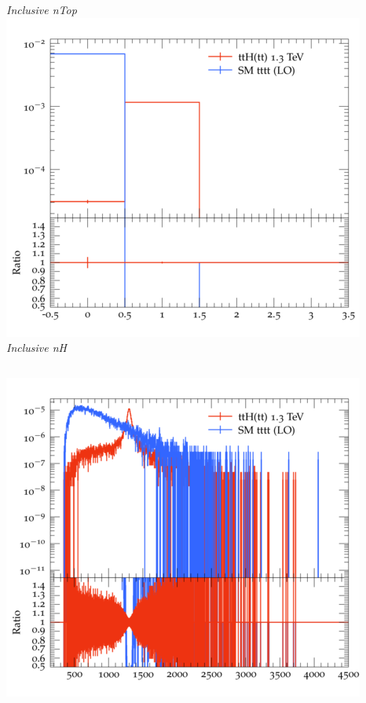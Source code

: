 \documentclass{beamer}
\begin{document}
\begin{frame}
\begin{columns}
\textit{\small Inclusive nTop}
\includegraphics[width=\textwidth]{../plots/ttH_1300/tttt_ttH/Inclusive_nH.png}\\
\textit{\small Inclusive nH}
\end{columns}
\begin{columns}
\includegraphics[width=\textwidth]{../plots/ttH_1300/tttt_ttH/Inclusive_InvM_ttbar12.png}\\

\end{columns}
\end{frame}
\end{document}
